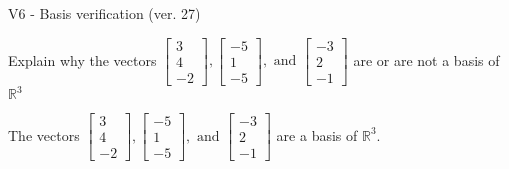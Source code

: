\begin{exercise}
  \begin{exerciseTitle}V6 - Basis verification (ver. 27)\end{exerciseTitle}
  \begin{exerciseStatement}
    Explain why the vectors \(\left[\begin{array}{r}
3 \\
4 \\
-2
\end{array}\right] , \left[\begin{array}{r}
-5 \\
1 \\
-5
\end{array}\right] , \text{ and } \left[\begin{array}{r}
-3 \\
2 \\
-1
\end{array}\right]\) are or are not a basis of \(\mathbb{R}^3\)	


  \end{exerciseStatement}
  \begin{exerciseAnswer}
   The vectors \(\left[\begin{array}{r}
3 \\
4 \\
-2
\end{array}\right] , \left[\begin{array}{r}
-5 \\
1 \\
-5
\end{array}\right] , \text{ and } \left[\begin{array}{r}
-3 \\
2 \\
-1
\end{array}\right]\) 
  	 are  a basis of \(\mathbb{R}^3\).
  


  \end{exerciseAnswer}
\end{exercise}